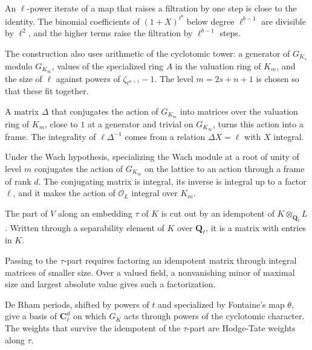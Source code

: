 An $\ell$-power iterate of a map that raises a filtration by one step is close
to the identity. The binomial coefficients of $(1+X)^{\ell^b}$ below degree
$\ell^{b-1}$ are divisible by $\ell^2$, and the higher terms raise the
filtration by $\ell^{b-1}$ steps.

The construction also uses arithmetic of the cyclotomic tower: a generator of
$G_{K_s}$ modulo $G_{K_\infty}$, values of the specialized ring $A$ in the
valuation ring of $K_m$, and the size of $\ell$ against powers of
$\zeta_{\ell^{n+1}}-1$. The level $m=2s+n+1$ is chosen so that these fit
together.

A matrix $\Delta$ that conjugates the action of $G_{K_m}$ into matrices over
the valuation ring of $K_m$, close to $1$ at a generator and trivial on
$G_{K_\infty}$, turns this action into a frame. The integrality of
$\ell\Delta^{-1}$ comes from a relation $\Delta X=\ell$ with $X$ integral.

Under the Wach hypothesis, specializing the Wach module at a root of unity of
level $m$ conjugates the action of $G_{K_m}$ on the lattice to an action
through a frame of rank $d$. The conjugating matrix is integral, its inverse is
integral up to a factor $\ell$, and it makes the action of $\mathcal O_L$
integral over $K_m$.

The part of $V$ along an embedding $\tau$ of $K$ is cut out by an idempotent of
$K\otimes_{\mathbf Q_\ell}L$. Written through a separability element of $K$
over $\mathbf Q_\ell$, it is a matrix with entries in $K$.

Passing to the $\tau$-part requires factoring an idempotent matrix through
integral matrices of smaller size. Over a valued field, a nonvanishing minor of
maximal size and largest absolute value gives such a factorization.

De Rham periods, shifted by powers of $t$ and specialized by Fontaine's map
$\theta$, give a basis of $\mathbf C_\ell^d$ on which $G_K$ acts through powers
of the cyclotomic character. The weights that survive the idempotent of the
$\tau$-part are Hodge-Tate weights along $\tau$.

